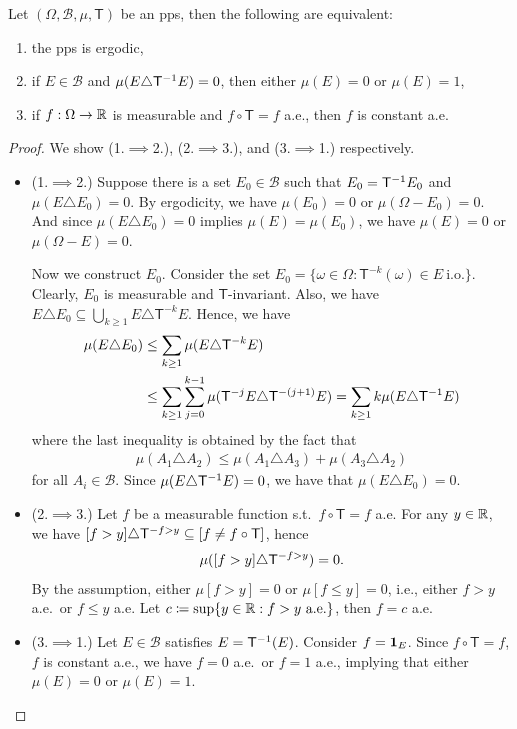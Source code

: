 \documentclass[a4paper]{article}
\begin{document}
\begin{lemma}\label{lem:ergodic-characterization}
	Let $(\Omega,\mathcal{B},\mu,\mathsf{T})$ be an \gls{pps}, then the following are equivalent:
	\begin{enumerate}
		\item the \gls{pps} is ergodic,
		\item if $E\in\mathcal{B}$ and $\mu(E\triangle\mathsf{T}\inv E)=0$, then either $\mu(E)=0$ or $\mu(E)=1$,
		\item if $f:\Omega\to\reals$ is measurable and $f\circ\mathsf{T}=f$ a.e., then $f$ is constant a.e.
	\end{enumerate}
\end{lemma}
\begin{proof}
	We show (1.$\implies$2.), (2.$\implies$3.), and (3.$\implies$1.) respectively.
	\begin{itemize}
		\item(1.$\implies$2.)
			Suppose there is a set $E_0\in\mathcal{B}$ such that $E_0=\mathsf{T}\inv E_0$ and $\mu(E\triangle E_0)=0$.
			By ergodicity, we have $\mu(E_0)=0$ or $\mu(\Omega-E_0)=0$.
			And since $\mu(E\triangle E_0)=0$ implies $\mu(E)=\mu(E_0)$, we have $\mu(E)=0$ or $\mu(\Omega-E)=0$.

			Now we construct $E_0$.
			Consider the set $E_0=\{\omega\in\Omega:\mathsf{T}^{-k}(\omega)\in E\ \text{i.o.}\}$.
			Clearly, $E_0$ is measurable and $\mathsf{T}$-invariant.
			Also, we have $E\triangle E_0\subseteq\bigcup_{k\geq1}E\triangle\mathsf{T}^{-k}E$.
			Hence, we have
			\begin{align*}
				\mu(E\triangle E_0)
				&\leq \sum_{k\geq1} \mu(E\triangle\mathsf{T}^{-k}E) \\
				&\leq \sum_{k\geq1} \sum_{j=0}^{k-1} \mu(\mathsf{T}^{-j}E\triangle\mathsf{T}^{-(j+1)}E)
				= \sum_{k\geq1} k \mu(E\triangle \mathsf{T}\inv E)
			\end{align*}
			where the last inequality is obtained by the fact that
			\begin{align*}
				\mu(A_1\triangle A_2)\leq\mu(A_1\triangle A_3)+\mu(A_3\triangle A_2)
			\end{align*}
			for all $A_i\in\mathcal{B}$.
			Since $\mu(E\triangle \mathsf{T}\inv E)=0$, we have that $\mu(E\triangle E_0)=0$.
		\item(2.$\implies$3.)
			Let $f$ be a measurable function s.t.\ $f\circ\mathsf{T}=f$ a.e.
			For any $y\in\reals$, we have
			$[f>y]\triangle\mathsf{T}\inv[f>y]\subseteq[f\neq f\circ\mathsf{T}]$,
			hence
			\begin{align*}
				\mu([f>y]\triangle\mathsf{T}\inv[f>y]) = 0.
			\end{align*}
			By the assumption, either $\mu[f>y]=0$ or $\mu[f\leq y]=0$, i.e.,
			either $f>y$ a.e.\ or $f\leq y$ a.e.
			Let $c\coloneqq\sup\{y\in\reals:f>y\ \text{a.e.}\}$,
			then $f=c$ a.e.
		\item(3.$\implies$1.)
			Let $E\in\mathcal{B}$ satisfies $E=\mathsf{T}\inv(E)$.
			Consider $f=\one_{E}$.
			Since $f\circ\mathsf{T}=f$, $f$ is constant a.e.,
			we have $f=0$ a.e.\ or $f=1$ a.e.,
			implying that either $\mu(E)=0$ or $\mu(E)=1$.
			\qedhere
	\end{itemize}
\end{proof}
\end{document}

